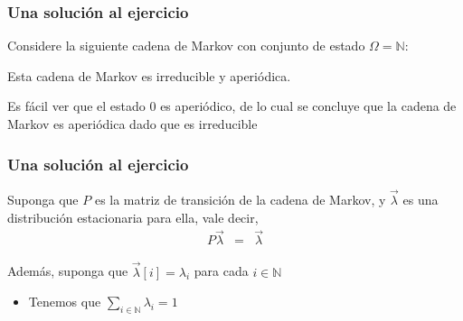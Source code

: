 \begin{frame}
\frametitle{Una solución al ejercicio}

{\small

Considere la siguiente cadena de Markov con conjunto de estado $\Omega = \mathbb{N}$:
\begin{center}
\end{center}


Esta cadena de Markov es irreducible y aperiódica.
\begin{itemize}
{\footnotesize \item Es fácil ver que el estado 0 es aperiódico, de lo cual se concluye que la cadena de Markov es aperiódica dado que es irreducible}
\end{itemize}

}

\end{frame}


\begin{frame}
\frametitle{Una solución al ejercicio}

{\small

Suponga que $P$ es la matriz de transición de la cadena de Markov, y $\vec \lambda$ es una distribución estacionaria para ella, vale decir,
\begin{eqnarray*}
P \vec \lambda &=& \vec \lambda
\end{eqnarray*}


Además, suponga que $\vec \lambda[i] = \lambda_i$ para cada $i \in \mathbb{N}$
\begin{itemize}
\item Tenemos que ${\displaystyle \sum_{i \in \mathbb{N}} \lambda_i = 1}$
\end{itemize}

}

\end{frame}

